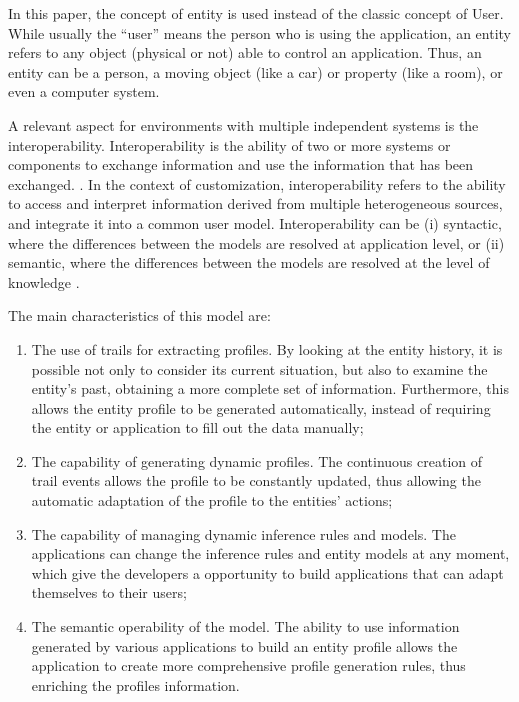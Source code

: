\documentclass{svjour3}                     %
\begin{document}
In this paper, the concept of entity is used instead of the classic concept of User. While usually the ``user'' means the person who is using the application, an entity refers to any object (physical or not) able to control an application.  Thus, an entity can be a person, a moving object (like a car) or property (like a room), or even a computer system. 

A relevant aspect for environments with multiple independent systems is the interoperability. Interoperability is the ability of two or more systems or components to exchange information and use the information that has been exchanged. \citep{ieeedict}. In the context of customization, interoperability refers to the ability to access and interpret information derived from multiple heterogeneous sources, and integrate it into a common user model. Interoperability can be (i) syntactic, where the differences between the models are resolved at application level, or (ii) semantic, where the differences between the models are resolved at the level of knowledge \citep{carmagnola09}.

The main characteristics of this model are:

\begin{enumerate}
  \item The use of trails for extracting profiles. By looking at the entity history, it is possible not only to consider its current situation, but also to examine the entity's past, obtaining a more complete set of information. Furthermore, this allows the entity profile to be generated automatically, instead of requiring the entity or application to fill out the data manually;
  \item The capability of generating dynamic profiles. The continuous creation of trail events allows the profile to be constantly updated, thus allowing the automatic adaptation of the profile to the entities' actions; 
  \item The capability of managing dynamic inference rules and models. The applications can change the inference rules and entity models at any moment, which give the developers a opportunity to build applications that can adapt themselves to their users;
  \item The semantic operability of the model. The ability to use information generated by various applications to build an entity profile allows the application to create more comprehensive profile generation rules, thus enriching the profiles information.
\end{enumerate}
\end{document}
